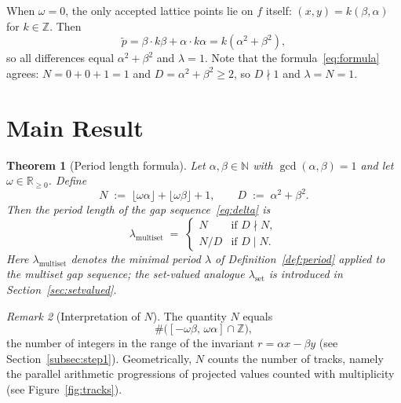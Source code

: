 \documentclass[11pt,reqno]{amsart}
\theoremstyle{plain}
\newtheorem{theorem}{Theorem}[section]
\theoremstyle{definition}
\theoremstyle{remark}
\newtheorem{remark}[theorem]{Remark}
\begin{document}
When \(\omega = 0\), the only accepted lattice points lie on \(f\) itself:
\((x, y) = k(\beta, \alpha)\) for \(k \in \mathbb{Z}\).
Then
\[
    \tilde{p} = \beta \cdot k\beta + \alpha \cdot k\alpha
    = k(\alpha^2+\beta^2),
\]
so all differences equal \(\alpha^2+\beta^2\) and \(\lambda = 1\).
Note that the formula~\eqref{eq:formula} agrees: \(N = 0 + 0 + 1 = 1\)
and \(D = \alpha^2+\beta^2 \ge 2\), so \(D \nmid 1\) and \(\lambda = N = 1\).

\section{Main Result}\label{sec:mainresult}

\begin{theorem}[Period length formula]\label{thm:main}
Let \(\alpha, \beta \in \mathbb{N}\) with \(\gcd(\alpha, \beta) = 1\) and let
\(\omega \in \mathbb{R}_{\ge 0}\).  Define
\begin{equation}\label{eq:ND}
    N \;:=\; \lfloor\omega\alpha\rfloor + \lfloor\omega\beta\rfloor + 1,
    \qquad
    D \;:=\; \alpha^2 + \beta^2.
\end{equation}
Then the period length of the gap sequence~\eqref{eq:delta} is
\begin{equation}\label{eq:formula}
    \lambda_{\mathrm{multiset}} \;=\;
    \begin{cases}
        N   & \text{if } D \nmid N, \\
        N/D & \text{if } D \mid N.
    \end{cases}
\end{equation}
Here \(\lambda_{\mathrm{multiset}}\) denotes the minimal period
\(\lambda\) of Definition~\ref{def:period} applied to the multiset gap
sequence; the set-valued analogue \(\lambda_{\mathrm{set}}\) is introduced
in Section~\ref{sec:setvalued}.
\end{theorem}

\begin{remark}[Interpretation of \(N\)]\label{rem:N}
The quantity \(N\) equals
\[
    \#\bigl([-\omega\beta,\,\omega\alpha]\cap\mathbb{Z}\bigr),
\]
the number of integers in the range of the invariant
\(r = \alpha x - \beta y\) (see Section~\ref{subsec:step1}).
Geometrically, \(N\) counts the number of tracks, namely the parallel arithmetic progressions of
projected values counted with multiplicity (see Figure~\ref{fig:tracks}).
\end{remark}
\end{document}
